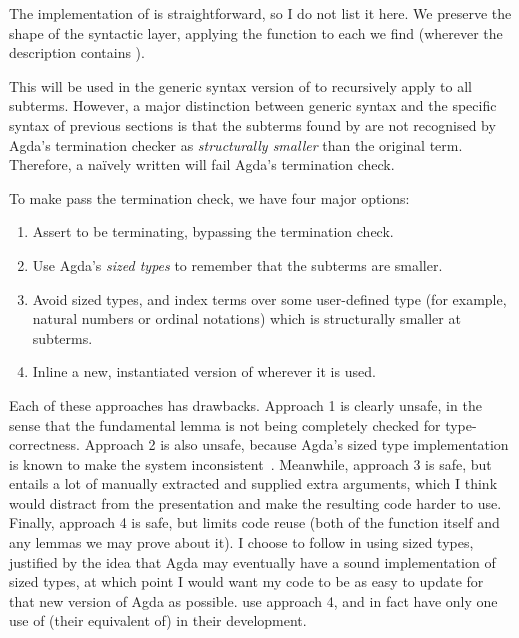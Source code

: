 
The implementation of  is straightforward, so I do not list
it here.
We preserve
the shape of the syntactic layer, applying the function to each 
we find (wherever the description contains \AgdaInductiveConstructor{$\langle$}%
\AgdaSpace{}\AgdaBound{$\Delta$}\AgdaSpace{}%
\AgdaSpace{}\AgdaSpace{}%
\AgdaInductiveConstructor{$\rangle$}).

This  will be used in the generic syntax version of
 to recursively apply  to all subterms.
However, a major distinction between generic syntax and the specific syntax of
previous sections is that the subterms found by  are not
recognised by Agda's termination checker as \emph{structurally smaller} than
the original term.
Therefore, a na\"{i}vely written  will fail Agda's termination
check.

To make  pass the termination check, we have four major
options:
\begin{enumerate}
  \item Assert  to be terminating, bypassing the termination
    check.
  \item Use Agda's \emph{sized types} to remember that the subterms are smaller.
  \item Avoid sized types, and index terms over some user-defined type (for
    example, natural numbers or ordinal notations) which is structurally smaller
    at subterms.
  \item Inline a new, instantiated version of  wherever it
    is used.
\end{enumerate}

Each of these approaches has drawbacks.
Approach 1 is clearly unsafe, in the sense that the fundamental lemma
 is not being completely checked for type-correctness.
Approach 2 is also unsafe, because Agda's sized type implementation is known to
make the system inconsistent~\citep{AgdaIssue1201}.
Meanwhile, approach 3 is safe, but entails a lot of manually extracted and
supplied extra arguments, which I think would distract from the presentation and
make the resulting code harder to use.
Finally, approach 4 is safe, but limits code reuse (both of the function
 itself and any lemmas we may prove about it).
I choose to follow \citet{AACMM21} in using sized types, justified by the idea
that Agda may eventually have a sound implementation of sized types, at which
point I would want my code to be as easy to update for that new version of Agda
as possible.
 use approach 4, and in fact have only one use of (their equivalent
of)  in their development.

